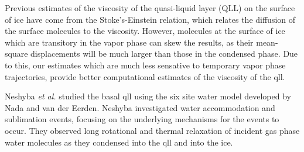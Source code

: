 Previous estimates of the viscosity of the quasi-liquid layer (QLL) on
the surface of ice have come from the Stoke's-Einstein relation, which
relates the diffusion of the surface molecules to the
viscosity. However, molecules at the surface of ice which are
transitory in the vapor phase can skew the results, as their
mean-square displacements will be much larger than those in the
condensed phase. Due to this, our estimates which are much less
sensative to temporary vapor phase trajectories, provide better
computational estimates of the viscosity of the qll.

Neshyba \textit{et al.} studied the basal qll using the six site water
model developed by Nada and van der Eerden. Neshyba investigated water
accommodation and sublimation events, focusing on the underlying
mechanisms for the events to occur. They observed long rotational and
thermal relaxation of incident gas phase water molecules as they
condensed into the qll and into the ice. \cite{Neshyba2009} 




